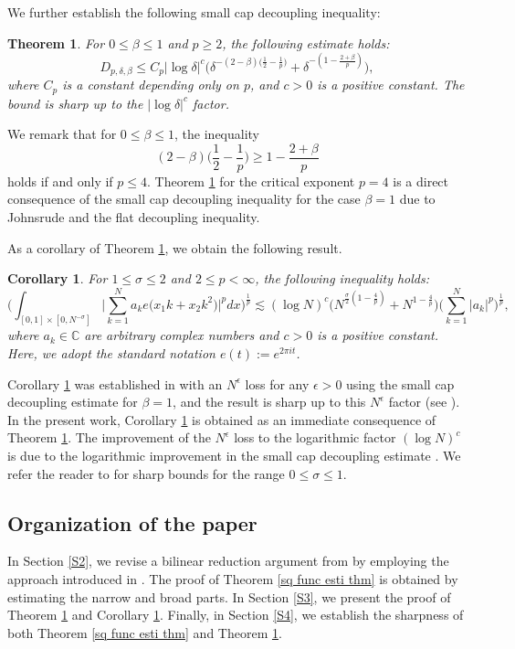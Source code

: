 \documentclass[reqno,centertags,11pt,a4paper]{amsart}
\newtheorem{theorem}[definition]{Theorem}
\newtheorem{corollary}[definition]{Corollary}
\begin{document}
We further establish the following small cap decoupling inequality:
\begin{theorem}\label{s cap}
For \(0\leq \beta\leq1\) and \(p\geq2\), the following estimate holds:
\begin{equation*}
D_{p,\delta,\beta}\leq C_p|\log \delta|^{c}\bigg(\delta^{-(2-\beta)\bigl(\frac{1}{2}-\frac{1}{p}\bigr)}+\delta^{-(1-\frac{2+\beta}{p})}\bigg),
\end{equation*}
where \(C_p\) is a constant depending only on \(p\), and \(c>0\) is a positive constant. The bound is sharp up to the \(|\log \delta|^{c}\) factor.
\end{theorem}

We remark that for \(0\leq \beta\leq1\), the inequality
\[
(2-\beta)\bigl(\frac{1}{2}-\frac{1}{p}\bigr)\geq 1-\frac{2+\beta}{p}
\]
holds if and only if \( p\leq4\). Theorem \ref{s cap} for the critical exponent $p=4$ is a direct consequence of the small cap decoupling inequality for the case \(\beta=1\) due to Johnsrude \cite{Johnsrude23} and the flat decoupling inequality.

As a corollary of Theorem \ref{s cap}, we obtain the following result.
\begin{corollary}\label{cor}
For \(1 \le \sigma \le 2\) and \(2 \le p <\infty\), the following inequality holds:
\[
\bigg(\int_{[0,1] \times [0, N^{-\sigma}]} \bigg| \sum_{k=1}^N a_k e\bigl(x_1 k + x_2 k^2\bigr) \bigg|^p dx\bigg)^{\frac{1}{p}} \lesssim (\log N)^c \bigg( N^{\frac{\sigma}{2}(1-\frac{4}{p})} + N^{1-\frac{4}{p}} \bigg) \bigg( \sum_{k=1}^N |a_k|^p \bigg)^{\frac{1}{p}},
\]
where \(a_k \in \mathbb{C}\) are arbitrary complex numbers and \(c>0\) is a positive constant. Here, we adopt the standard notation \(e(t) := e^{2\pi i t}\).
\end{corollary}

Corollary \ref{cor} was established in \cite{MO24} with an \(N^\epsilon\) loss for any \(\epsilon>0\) using the small cap decoupling estimate \cite{DGW20} for $\beta=1$, and the result is sharp up to this \(N^\epsilon\) factor (see \cite[Section 1.1]{MO24}). In the present work, Corollary \ref{cor} is obtained as an immediate consequence of Theorem \ref{s cap}. The improvement of the \(N^\epsilon\) loss to the logarithmic factor \( (\log N)^{c}\) is due to the logarithmic improvement in the small cap decoupling estimate \cite{Johnsrude23}. We refer the reader to \cite{DGW20} for sharp bounds for the range $0\leq \sigma \leq 1$.

\subsection*{Organization of the paper}
In Section \ref{S2}, we revise a bilinear reduction argument from \cite{DGW20} by employing the approach introduced in \cite{GMW24}. The proof of Theorem \ref{sq func esti thm} is obtained by estimating the narrow and broad parts. In Section \ref{S3}, we present the proof of Theorem \ref{s cap} and Corollary \ref{cor}. Finally, in Section \ref{S4}, we establish the sharpness of both Theorem \ref{sq func esti thm} and Theorem \ref{s cap}.
\end{document}
